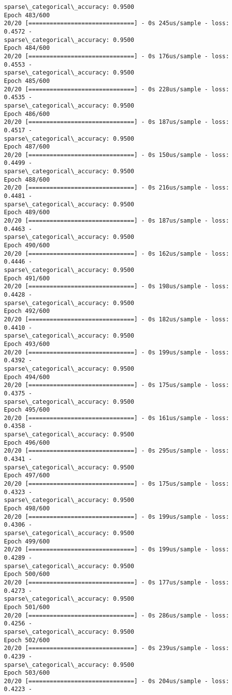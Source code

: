 \documentclass[11pt]{article}
\begin{document}
\begin{Verbatim}[commandchars=\\\{\}]
sparse\_categorical\_accuracy: 0.9500
Epoch 483/600
20/20 [==============================] - 0s 245us/sample - loss: 0.4572 -
sparse\_categorical\_accuracy: 0.9500
Epoch 484/600
20/20 [==============================] - 0s 176us/sample - loss: 0.4553 -
sparse\_categorical\_accuracy: 0.9500
Epoch 485/600
20/20 [==============================] - 0s 228us/sample - loss: 0.4535 -
sparse\_categorical\_accuracy: 0.9500
Epoch 486/600
20/20 [==============================] - 0s 187us/sample - loss: 0.4517 -
sparse\_categorical\_accuracy: 0.9500
Epoch 487/600
20/20 [==============================] - 0s 150us/sample - loss: 0.4499 -
sparse\_categorical\_accuracy: 0.9500
Epoch 488/600
20/20 [==============================] - 0s 216us/sample - loss: 0.4481 -
sparse\_categorical\_accuracy: 0.9500
Epoch 489/600
20/20 [==============================] - 0s 187us/sample - loss: 0.4463 -
sparse\_categorical\_accuracy: 0.9500
Epoch 490/600
20/20 [==============================] - 0s 162us/sample - loss: 0.4446 -
sparse\_categorical\_accuracy: 0.9500
Epoch 491/600
20/20 [==============================] - 0s 198us/sample - loss: 0.4428 -
sparse\_categorical\_accuracy: 0.9500
Epoch 492/600
20/20 [==============================] - 0s 182us/sample - loss: 0.4410 -
sparse\_categorical\_accuracy: 0.9500
Epoch 493/600
20/20 [==============================] - 0s 199us/sample - loss: 0.4392 -
sparse\_categorical\_accuracy: 0.9500
Epoch 494/600
20/20 [==============================] - 0s 175us/sample - loss: 0.4375 -
sparse\_categorical\_accuracy: 0.9500
Epoch 495/600
20/20 [==============================] - 0s 161us/sample - loss: 0.4358 -
sparse\_categorical\_accuracy: 0.9500
Epoch 496/600
20/20 [==============================] - 0s 295us/sample - loss: 0.4341 -
sparse\_categorical\_accuracy: 0.9500
Epoch 497/600
20/20 [==============================] - 0s 175us/sample - loss: 0.4323 -
sparse\_categorical\_accuracy: 0.9500
Epoch 498/600
20/20 [==============================] - 0s 199us/sample - loss: 0.4306 -
sparse\_categorical\_accuracy: 0.9500
Epoch 499/600
20/20 [==============================] - 0s 199us/sample - loss: 0.4289 -
sparse\_categorical\_accuracy: 0.9500
Epoch 500/600
20/20 [==============================] - 0s 177us/sample - loss: 0.4273 -
sparse\_categorical\_accuracy: 0.9500
Epoch 501/600
20/20 [==============================] - 0s 286us/sample - loss: 0.4256 -
sparse\_categorical\_accuracy: 0.9500
Epoch 502/600
20/20 [==============================] - 0s 239us/sample - loss: 0.4239 -
sparse\_categorical\_accuracy: 0.9500
Epoch 503/600
20/20 [==============================] - 0s 204us/sample - loss: 0.4223 -

\end{Verbatim}
\end{document}
